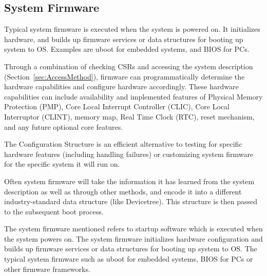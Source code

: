 \subsection{System Firmware}

Typical system firmware is executed when the system is powered on. It
initializes hardware, and builds up firmware services or data structures for
booting up system to OS. Examples are uboot for embedded systems, and BIOS for
PCs.

Through a combination of checking CSRs and
accessing the system description (Section~\ref{sec:AccessMethod}), firmware
can programmatically determine the hardware capabilities and configure hardware
accordingly.  These hardware capabilities can include availability and
implemented features of Physical Memory Protection (PMP), Core Local Interrupt
Controller (CLIC), Core Local Interruptor (CLINT), memory map, Real Time Clock (RTC), reset mechanism, and any future optional core features.

The Configuration Structure is an efficient alternative to testing for specific
hardware features (including handling failures) or customizing system firmware
for the specific system it will run on.

Often system firmware will take the information it has learned from the system
description as well as through other methods, and encode it into a different
industry-standard data structure (like Devicetree).  This structure is then
passed to the subsequent boot process.

\begin{commentary}
The system firmware mentioned refers to startup software which is executed
when the system powers on. The system firmware initializes hardware configuration and
builds up firmware services or data structures for booting up system to OS. The typical
system firmware such as uboot for embedded systems, BIOS for PCs or other firmware
frameworks.
\end{commentary}

